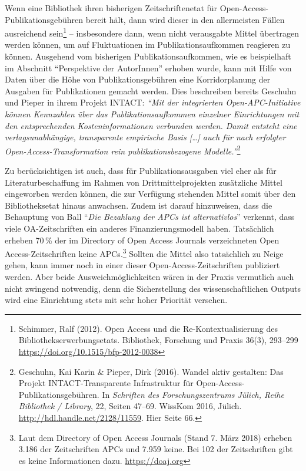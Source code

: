 \documentclass[a4paper,
fontsize=11pt,
oneside,
numbers=noperiodatend,
parskip=half-,
bibliography=totoc,
final
]{scrartcl}
\begin{document}
Wenn eine Bibliothek ihren bisherigen Zeitschriftenetat für
Open-Access-Publikationsgebühren bereit hält, dann wird dieser in den
allermeisten Fällen ausreichend sein\footnote{Schimmer, Ralf (2012).
  Open Access und die Re-Kontextualisierung des
  Bibliothekserwerbungsetats. Bibliothek, Forschung und Praxis 36(3),
  293--299 \url{https://doi.org/10.1515/bfp-2012-0038}} -- insbesondere
dann, wenn nicht verausgabte Mittel übertragen werden können, um auf
Fluktuationen im Publikationsaufkommen reagieren zu können. Ausgehend
vom bisherigen Publikationsaufkommen, wie es beispielhaft im Abschnitt
\enquote{Perspektive der AutorInnen} erhoben wurde, kann mit Hilfe von
Daten über die Höhe von Publikationsgebühren eine Korridorplanung der
Ausgaben für Publikationen gemacht werden. Dies beschreiben bereits
Geschuhn und Pieper in ihrem Projekt INTACT: \emph{\enquote{Mit der
integrierten Open-APC-Initiative können Kennzahlen über das
Publikationsaufkommen einzelner Einrichtungen mit den entsprechenden
Kosteninformationen verbunden werden. Damit entsteht eine
verlagsunabhängige, transparente empirische Basis {[}\ldots{}{]} auch
für nach erfolgter Open-Access-Transformation rein publikationsbezogene
Modelle.}}\footnote{Geschuhn, Kai Karin \& Pieper, Dirk (2016). Wandel
  aktiv gestalten: Das Projekt INTACT-Transparente Infrastruktur für
  Open-Access-Publikationsgebühren. In \emph{Schriften des
  Forschungszentrums Jülich, Reihe Bibliothek / Library}, 22, Seiten
  47--69. WissKom 2016, Jülich. \url{http://hdl.handle.net/2128/11559}.
  Hier Seite 66.}

Zu berücksichtigen ist auch, dass für Publikationsausgaben viel eher als
für Literaturbeschaffung im Rahmen von Drittmittelprojekten zusätzliche
Mittel eingeworben werden können, die zur Verfügung stehenden Mittel
somit über den Bibliotheksetat hinaus anwachsen. Zudem ist darauf
hinzuweisen, dass die Behauptung von Ball \enquote{\emph{Die Bezahlung
der APCs ist alternativlos}} verkennt, dass viele OA-Zeitschriften ein
anderes Finanzierungsmodell haben. Tatsächlich erheben 70\,\% der im
Directory of Open Access Journals verzeichneten Open
Access-Zeitschriften keine APCs.\footnote{Laut dem Directory of Open
  Access Journals (Stand 7. März 2018) erheben 3.186 der Zeitschriften
  APCs und 7.959 keine. Bei 102 der Zeitschriften gibt es keine
  Informationen dazu. \url{https://doaj.org}} Sollten die Mittel also
tatsächlich zu Neige gehen, kann immer noch in einer dieser
Open-Access-Zeitschriften publiziert werden. Aber beide
Ausweichmöglichkeiten wären in der Praxis vermutlich auch nicht zwingend
notwendig, denn die Sicherstellung des wissenschaftlichen Outputs wird
eine Einrichtung stets mit sehr hoher Priorität versehen.
\end{document}
